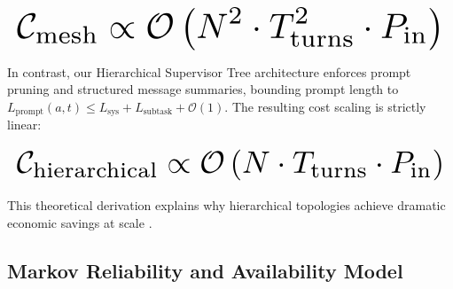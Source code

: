 \documentclass[10pt,journal,compsoc,twocolumn]{IEEEtran}
\begin{document}
\begin{equation}
\resizebox{\columnwidth}{!}{$\displaystyle
\begin{aligned}
\mathcal{C}_{\text{mesh}} \propto \mathcal{O}\left(N^2 \cdot T_{\text{turns}}^2 \cdot P_{\text{in}}\right)
\end{aligned}
$}
\end{equation}



















In contrast, our Hierarchical Supervisor Tree architecture enforces prompt pruning and structured message summaries, bounding prompt length to $L_{\text{prompt}}(a, t) \le L_{\text{sys}} + L_{\text{subtask}} + \mathcal{O}(1)$. The resulting cost scaling is strictly linear:



















\begin{equation}
\resizebox{\columnwidth}{!}{$\displaystyle
\begin{aligned}
\mathcal{C}_{\text{hierarchical}} \propto \mathcal{O}\left(N \cdot T_{\text{turns}} \cdot P_{\text{in}}\right)
\end{aligned}
$}
\end{equation}



















This theoretical derivation explains why hierarchical topologies achieve dramatic economic savings at scale \cite{arxiv_2501_02497}.




\subsection{Markov Reliability and Availability Model}
\end{document}
